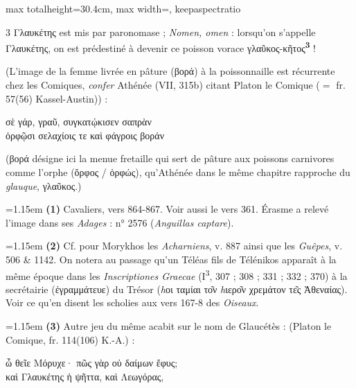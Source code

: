 \documentclass[11pt,twoside]{book}
\newcommand{\italique}[1]{\textit{#1}}
\newcommand{\citComm}[1]{\begin{quoting}[vskip=0.4pt,leftmargin=0.7em,rightmargin=0.2em]#1\end{quoting}}
\newcommand{\expo}[1]{\textsuperscript{#1}}
\newcommand{\latin}[1]{\textit{#1}}
\newcommand{\marqueur}[1]{\textsuperscript{\color{rubricRed}\textbf{#1}}}
\begin{document}
\begin{adjustbox}{max totalheight=30.4cm, max width=\textwidth, keepaspectratio}
\begin{minipage}{\textwidth}
{\begin{multicols}{3}
\noindent Γλαυκέτης est mis par paronomase ; \italique{Nomen, omen} : lorsqu'on s'appelle Γλαυκέτης, on est prédestiné à devenir ce poisson vorace γλαῦκος-κῆτος\marqueur{3} !
\par\vspace{1.5pt}
\noindent (L'image de la femme livrée en pâture (βορά) à la poissonnaille est récurrente chez les Comiques, \italique{confer} Athénée (VII, 315b) citant Platon le Comique ($=$ fr. 57(56) Kassel-Austin)) :
\citComm{σὲ γάρ, γραῦ, συγκατῴκισεν σαπρὰν\\
ὀρφῷσι σελαχίοις τε καὶ φάγροις βοράν}
\par\vspace{1.5pt}
\noindent (βορά désigne ici la menue fretaille qui sert de pâture aux poissons carnivores comme l'orphe (ὄρφος / ὀρφώς), qu'Athénée dans le même chapitre rapproche du \italique{glauque}, γλαῦκος.)\\
\par\vspace{1.5pt}
\par\vspace{1.2pt}\par\nopagebreak\vspace{1pt}\noindent\hangindent=1.15em {\color{sepiaNote}\textbf{(1)}} Cavaliers, vers 864-867. Voir aussi le vers 361. Érasme a relevé l'image dans ses \italique{Adages} : n° 2576 (\latin{Anguillas captare}).
\par\vspace{1.5pt}
\noindent\hangindent=1.15em {\color{sepiaNote}\textbf{(2)}} Cf. pour Morykhos les \italique{Acharniens}, v. 887 ainsi que les \italique{Guêpes}, v. 506 \& 1142. On notera au passage qu'un Téléas fils de Télénikos apparaît à la même époque dans les \italique{Inscriptiones Graecae} (I\expo{3}, 307 ; 308 ; 331 ; 332 ; 370) à la secrétairie (ἐγραμμάτευε) du Trésor (\textit{h}οι ταμίαι το͂ν \textit{h}ιερο͂ν χρεμάτον τε͂ς Ἀθεναίας). Voir ce qu'en disent les scholies aux vers 167-8 des \italique{Oiseaux}.
\par\vspace{1.5pt}
\noindent\hangindent=1.15em {\color{sepiaNote}\textbf{(3)}} Autre jeu du même acabit sur le nom de Glaucétès : (Platon le Comique, fr. 114(106) K.-A.) :
\citComm{ὦ θεῖε Μόρυχε· πῶς γὰρ οὐ δαίμων ἔφυς;\\
καὶ Γλαυκέτης ἡ ψῆττα, καὶ Λεωγόρας,\\
}
\end{multicols}}
\end{minipage}
\end{adjustbox}
\end{document}
